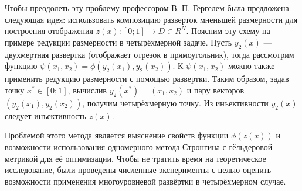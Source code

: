 \par
Чтобы преодолеть эту проблему профессором В. П. Гергелем была предложена следующая идея: использовать композицию разверток мненьшей размерности для построения отображения
\(z(x): [0;1] \rightarrow D \in R^N\).
Поясним эту схему на примере редукции размерности в четырёхмерной задаче. Пусть \(y_2(x)\) --- двухмертная развертка (отображает отрезок в прямоугольник), тогда рассмотрим функцию
\(\psi(x_1,x_2)=\phi(y_2(x_1), y_2(x_2))\). К \(\psi(x_1,x_2)\) можно также применить редукцию размерности с помощью развертки. Таким образом, задав точку \(x^*\in [0;1]\),
вычислив \(y_2(x^*)=(x_1,x_2)\) и пару векторов \((y_2(x_1), y_2(x_2))\), получим четырёхмерную точку. Из инъективности \(y_2(x)\) следует инъективность \(z(x)\).
\par
Проблемой этого метода является выяснение свойств функции \(\phi(z(x))\) и возможности использования одномерного метода Стронгина с гёльдеровой метрикой для её оптимизации.
Чтобы не тратить время на теоретическое исследование, были проведены численные эксперименты с целью оценить возможности применения многоуровневой развёртки в четырёхмерном случае.
